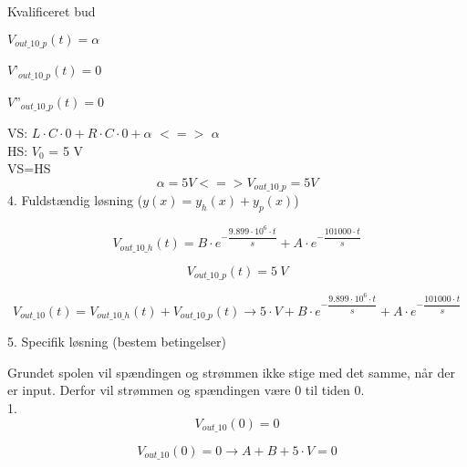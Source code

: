 Kvalificeret bud
\begin{center}
\begin{minipage}{.2\linewidth}$V_{out\_10\_p}  \left(t\right)  = \alpha$
\end{minipage}
\begin{minipage}{.2\linewidth}
$V$'$_{out\_10\_p}  \left(t\right) = 0$
\end{minipage}
\begin{minipage}{.2\linewidth}
$V$''$_{out\_10\_p}  \left(t\right)  = 0$
\end{minipage}
\end{center}

VS: $L\cdot C\cdot 0 + R\cdot C\cdot 0 + \alpha$ $<=>$ $\alpha$ \\

HS: $V_0$ = 5 V \\

VS=HS \begin{equation}
\alpha=5 V <=> V_{out\_10\_p} = 5 V 
\end{equation} 
4. Fuldstændig løsning ($y(x) = y_h(x)+y_p(x)$)

\begin{equation}
	V_{out\_10\_h} \left(t\right)  = B\cdot e^{ -\dfrac{9.899\cdot 10^{6}\cdot t}{s}}+A\cdot e^{ -\dfrac{101000\cdot t}{s}}
\end{equation}

\begin{equation}
	V_{out\_10\_p} \left(t\right)  = 5\ V
	\label{partikulær10K}
\end{equation}

\begin{equation}
	V_{out\_10} \left(t\right)  = V_{out\_10\_h}  \left(t\right) +V_{out\_10\_p}  \left(t\right)  \xrightarrow{} 5\cdot V+B\cdot e^{ -\dfrac{9.899\cdot 10^{6}\cdot t}{s}}+A\cdot e^{ -\dfrac{101000\cdot t}{s}}
\end{equation} 

5. Specifik løsning (bestem betingelser)

Grundet spolen vil spændingen og strømmen ikke stige med det samme, når der er input. Derfor vil strømmen og spændingen være 0 til tiden 0. \\

1. \begin{equation}
V_{out\_10}  \left(0\right)  = 0
\end{equation}

\begin{equation}
	V_{out\_10}  \left(0\right)  = 0 \xrightarrow{} A+B+5\cdot V = 0
\end{equation}

